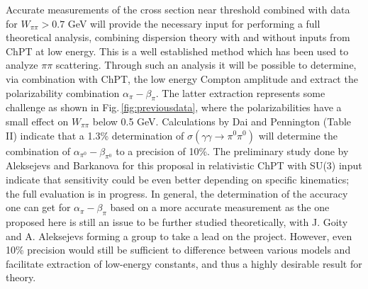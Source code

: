 Accurate measurements of the cross section near threshold combined
with data for $W_{\pi\pi}>0.7$ GeV will provide the necessary input
for performing a full theoretical analysis, combining dispersion
theory with and without inputs from ChPT at low energy. This is a well
established method which has been used to analyze $\pi\pi$
scattering. Through such an analysis it will be possible to determine,
via combination with ChPT, the low energy Compton amplitude and
extract the polarizability combination $\alpha_\pi-\beta_\pi$. The
latter extraction represents some challenge as shown in
Fig.\,\ref{fig:previousdata}, where the polarizabilities have a small
effect on $W_{\pi\pi}$ below 0.5 GeV.  Calculations by Dai and
Pennington (Table II) \cite{Dai:2016ytz} indicate that a 1.3\%
determination of $\sigma(\gamma\gamma\rightarrow\pi^0\pi^0)$ will
determine the combination of $\alpha_{\pi^0}-\beta_{\pi^0}$ to a
precision of 10\%. The preliminary study done by Aleksejevs and
Barkanova for this proposal in relativistic ChPT with SU(3) input
indicate that sensitivity could be even better depending on specific
kinematics; the full evaluation is in progress. In general, the
determination of the accuracy one can get for $\alpha_\pi-\beta_\pi$
based on a more accurate measurement as the one proposed here is still
an issue to be further studied theoretically, with J. Goity and
A. Aleksejevs forming a group to take a lead on the project. However,
even 10\% precision would still be sufficient to difference between
various models and facilitate extraction of low-energy constants, and
thus a highly desirable result for theory.

